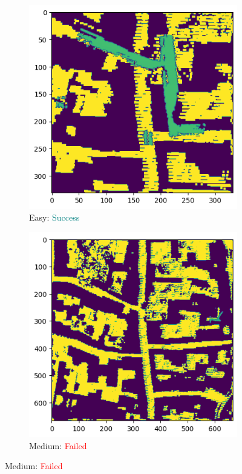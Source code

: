 \documentclass[11pt]{article}
\begin{document}
    \newpage
    \begin{figure}[p]
        \centering
        \begin{subfigure}{0.45\textwidth}
            \centering
            \includegraphics[width=\linewidth]{images/full/easy/5_7_2_easy}
            \caption{Easy: \textcolor{teal}{Success}}
            \label{fig:5_7_2_easy}
        \end{subfigure}
        \hfill
        \begin{subfigure}{0.45\textwidth}
            \centering
            \includegraphics[width=\linewidth]{images/full/medium/5_7_2_medium}
            \caption{Medium: \textcolor{red}{Failed}}
            \label{fig:5_7_2_medium}
        \end{subfigure}


\end{figure}
\end{document}
